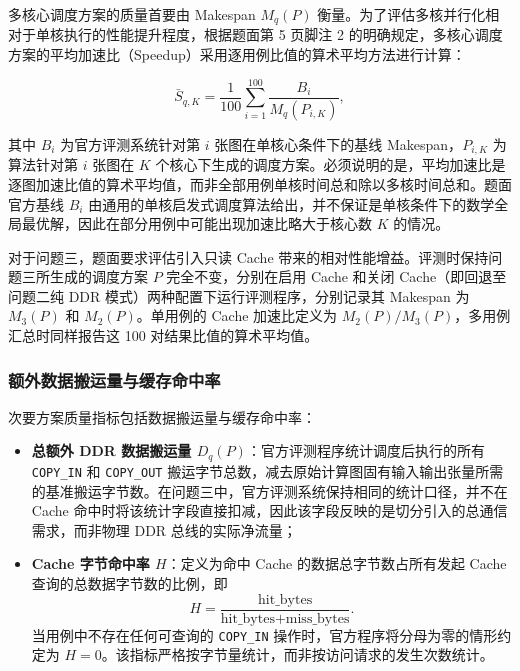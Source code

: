 \documentclass[anonymous,withtoc]{gmcm2026}
\providecommand{\tightlist}{\setlength{\itemsep}{0pt}\setlength{\parskip}{0pt}}
\begin{document}
多核心调度方案的质量首要由 Makespan \(M_q(P)\) 衡量。为了评估多核并行化相对于单核执行的性能提升程度，根据题面第 5 页脚注 2 的明确规定，多核心调度方案的平均加速比（Speedup）采用逐用例比值的算术平均方法进行计算：

\begin{equation}
\bar{S}_{q,K} = \frac{1}{100} \sum_{i=1}^{100} \frac{B_i}{M_q(P_{i,K})},
\end{equation}

其中 \(B_i\) 为官方评测系统针对第 \(i\) 张图在单核心条件下的基线 Makespan，\(P_{i,K}\) 为算法针对第 \(i\) 张图在 \(K\) 个核心下生成的调度方案。必须说明的是，平均加速比是逐图加速比值的算术平均值，而非全部用例单核时间总和除以多核时间总和。题面官方基线 \(B_i\) 由通用的单核启发式调度算法给出，并不保证是单核条件下的数学全局最优解，因此在部分用例中可能出现加速比略大于核心数 \(K\) 的情况。

对于问题三，题面要求评估引入只读 Cache 带来的相对性能增益。评测时保持问题三所生成的调度方案 \(P\) 完全不变，分别在启用 Cache 和关闭 Cache（即回退至问题二纯 DDR 模式）两种配置下运行评测程序，分别记录其 Makespan 为 \(M_3(P)\) 和 \(M_2(P)\)。单用例的 Cache 加速比定义为 \(M_2(P) / M_3(P)\)，多用例汇总时同样报告这 100 对结果比值的算术平均值。

\subsubsection{额外数据搬运量与缓存命中率}

次要方案质量指标包括数据搬运量与缓存命中率：

\begin{itemize}
\tightlist
\item
  \textbf{总额外 DDR 数据搬运量 \(D_q(P)\)}：官方评测程序统计调度后执行的所有 \texttt{COPY\_IN} 和 \texttt{COPY\_OUT} 搬运字节总数，减去原始计算图固有输入输出张量所需的基准搬运字节数。在问题三中，官方评测系统保持相同的统计口径，并不在 Cache 命中时将该统计字段直接扣减，因此该字段反映的是切分引入的总通信需求，而非物理 DDR 总线的实际净流量；
\item
  \textbf{Cache 字节命中率 \(H\)}：定义为命中 Cache 的数据总字节数占所有发起 Cache 查询的总数据字节数的比例，即 \begin{equation}
H = \frac{\text{hit\_bytes}}{\text{hit\_bytes} + \text{miss\_bytes}}.
\end{equation} 当用例中不存在任何可查询的 \texttt{COPY\_IN} 操作时，官方程序将分母为零的情形约定为 \(H = 0\)。该指标严格按字节量统计，而非按访问请求的发生次数统计。
\end{itemize}
\end{document}
